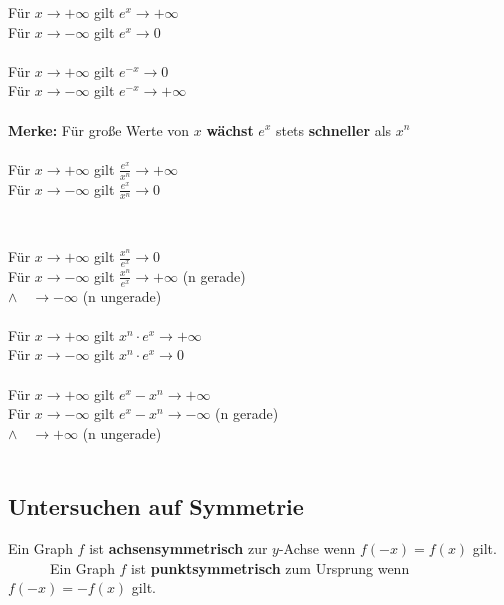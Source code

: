 \begin{minipage}{0.43\textwidth}
    Für $x \to +\infty$ gilt \quad $e^x \to +\infty$ \\
    Für $x \to -\infty$ gilt \quad $e^x \to 0$ \\
    \ \\
    Für $x \to +\infty$ gilt \quad $e^{-x} \to 0$ \\
    Für $x \to -\infty$ gilt \quad $e^{-x} \to +\infty$ \\
    \ \\
    \textbf{Merke:} Für große Werte von $x$ \textbf{wächst} $e^x$ stets \textbf{\glqq schneller\grqq} als $x^n$\\
    \ \\
    Für $x \to +\infty$ gilt \quad $\frac{e^x}{x^n} \to +\infty$ \\
    Für $x \to -\infty$ gilt \quad $\frac{e^x}{x^n} \to 0$ \\
\end{minipage}
\begin{minipage}[t]{0.01\textwidth}
    \
\end{minipage}
\begin{minipage}{0.56\textwidth}
    Für $x \to +\infty$ gilt \quad $\frac{x^n}{e^x} \to 0$ \\
    Für $x \to -\infty$ gilt \quad $\frac{x^n}{e^x} \to +\infty$ (n gerade)\\
    $\land$\qquad \qquad \qquad \quad \ \ \qquad $\to -\infty$ (n ungerade) \\
    \ \\
    Für $x \to +\infty$ gilt \quad $x^n \cdot e^x \to +\infty$ \\
    Für $x \to -\infty$ gilt \quad $x^n \cdot e^x \to 0$ \\
    \ \\
    Für $x \to +\infty$ gilt \quad $e^x - x^n \to +\infty$ \\
    Für $x \to -\infty$ gilt \quad $e^x - x^n \to -\infty$ (n gerade) \\
    $\land$\qquad \qquad \qquad \qquad \quad \, \ \qquad $\to +\infty$ (n ungerade) \\
    \ \\
\end{minipage}

\subsection{Untersuchen auf Symmetrie}
\begin{satz}
    Ein Graph $f$ ist \textbf{achsensymmetrisch} zur $y$-Achse wenn $f(-x) = f(x)$ gilt. \\
    \phantom \qquad \ \ \ \ \ \, Ein Graph $f$ ist \textbf{punktsymmetrisch} zum Ursprung wenn $f(-x) = -f(x)$ gilt. 
\end{satz}

